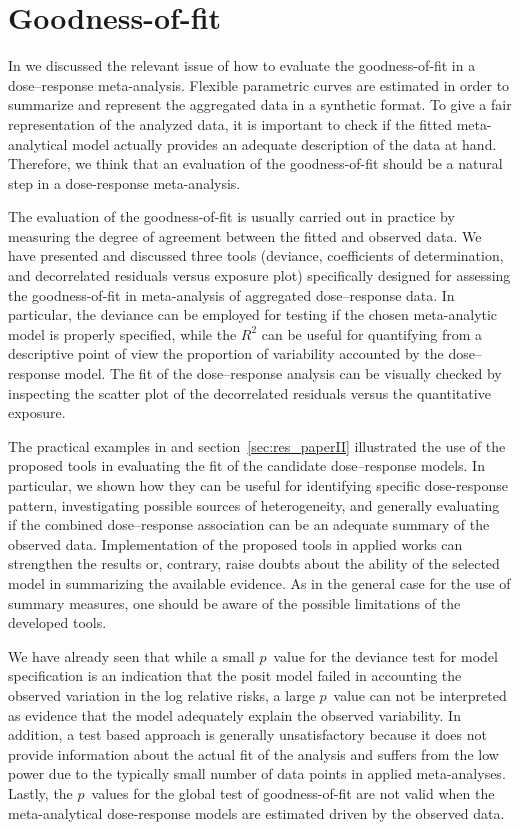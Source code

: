 \documentclass[11pt,a4paper,twoside,openany]{book}\usepackage{knitr}
\begin{document}
{\section{Goodness-of-fit}

In  we discussed the relevant issue of how to evaluate the goodness-of-fit in a dose--response meta-analysis. Flexible parametric curves are estimated in order to summarize and represent the aggregated data in a synthetic format. To give a fair representation of the analyzed data, it is important to check if the fitted meta-analytical model actually provides an adequate description of the data at hand. Therefore, we think that an evaluation of the goodness-of-fit should be a natural step in a dose-response meta-analysis.

The evaluation of the goodness-of-fit is usually carried out in practice by measuring the degree of agreement between the fitted and observed data. We have presented and discussed three tools (deviance, coefficients of determination, and decorrelated residuals versus exposure plot) specifically designed for assessing the goodness-of-fit in meta-analysis of aggregated dose--response data. In particular, the deviance can be employed for testing if the chosen meta-analytic model is properly specified, while the $R^2$ can be useful for quantifying from a descriptive point of view the proportion of variability accounted by the dose--response model. The fit of the dose--response analysis can be visually checked by inspecting the scatter plot of the decorrelated residuals versus the quantitative exposure.

The practical examples in  and section~\ref{sec:res_paperII} illustrated the use of the proposed tools in evaluating the fit of the candidate dose--response models. In particular, we shown how they can be useful for identifying specific dose-response pattern, investigating possible sources of heterogeneity, and generally evaluating if the combined dose--response association can be an adequate summary of the observed data. Implementation of the proposed tools in applied works can strengthen the results or, contrary, raise doubts about the ability of the selected model in summarizing the available evidence. As in the general case for the use of summary measures, one should be aware of the possible limitations of the developed tools.

\noindent We have already seen that while a small $p$~value for the deviance test for model specification is an indication that the posit model failed in accounting the observed variation in the log relative risks, a large $p$~value can not be interpreted as evidence that the model adequately explain the observed variability. In addition, a test based approach is generally unsatisfactory because it does not provide information about the actual fit of the analysis and suffers from the low power due to the typically small number of data points in applied meta-analyses. Lastly, the $p$~values for the global test of goodness-of-fit are not valid when the meta-analytical dose-response models are estimated driven by the observed data.

}
\end{document}
